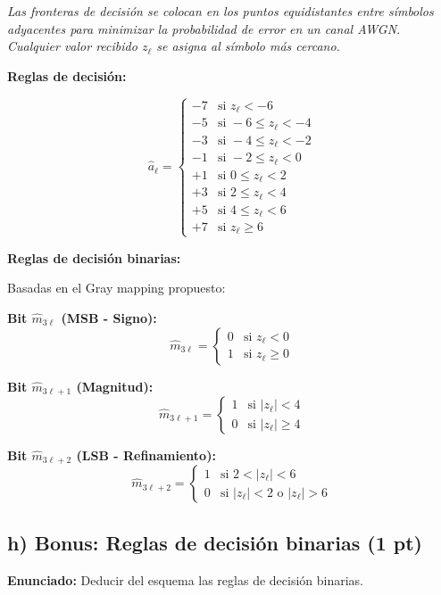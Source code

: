 \documentclass[11pt,a4paper]{article}
\begin{document}
\textit{Las fronteras de decisi\'on se colocan en los puntos equidistantes entre s\'imbolos adyacentes para minimizar la probabilidad de error en un canal AWGN. Cualquier valor recibido $z_\ell$ se asigna al s\'imbolo m\'as cercano.}

\textbf{Reglas de decisi\'on:}

\[
\hat{a}_\ell = \begin{cases}
-7 & \text{si } z_\ell < -6 \\
-5 & \text{si } -6 \leq z_\ell < -4 \\
-3 & \text{si } -4 \leq z_\ell < -2 \\
-1 & \text{si } -2 \leq z_\ell < 0 \\
+1 & \text{si } 0 \leq z_\ell < 2 \\
+3 & \text{si } 2 \leq z_\ell < 4 \\
+5 & \text{si } 4 \leq z_\ell < 6 \\
+7 & \text{si } z_\ell \geq 6
\end{cases}
\]

\textbf{Reglas de decisi\'on binarias:}

Basadas en el Gray mapping propuesto:

\textbf{Bit $\hat{m}_{3\ell}$ (MSB - Signo):}
\[
\boxed{\hat{m}_{3\ell} = \begin{cases}
0 & \text{si } z_\ell < 0 \\
1 & \text{si } z_\ell \geq 0
\end{cases}}
\]

\textbf{Bit $\hat{m}_{3\ell+1}$ (Magnitud):}
\[
\boxed{\hat{m}_{3\ell+1} = \begin{cases}
1 & \text{si } |z_\ell| < 4 \\
0 & \text{si } |z_\ell| \geq 4
\end{cases}}
\]

\textbf{Bit $\hat{m}_{3\ell+2}$ (LSB - Refinamiento):}
\[
\boxed{\hat{m}_{3\ell+2} = \begin{cases}
1 & \text{si } 2 < |z_\ell| < 6 \\
0 & \text{si } |z_\ell| < 2 \text{ o } |z_\ell| > 6
\end{cases}}
\]



\subsection*{h) Bonus: Reglas de decisi\'on binarias (1 pt)}

\textbf{Enunciado:} Deducir del esquema las reglas de decisi\'on binarias.
\end{document}

